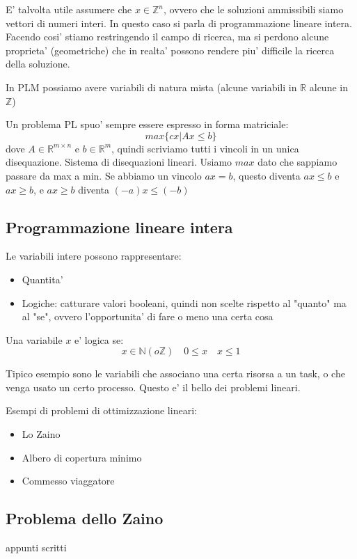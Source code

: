 E' talvolta utile assumere che $ x \in \mathbb{Z}^n $, ovvero che le soluzioni ammissibili siamo vettori di numeri interi. In questo caso si parla di programmazione lineare intera. Facendo cosi' stiamo restringendo il campo di ricerca, ma si perdono alcune proprieta' (geometriche) che in realta' possono rendere piu' difficile la ricerca della soluzione.

In PLM possiamo avere variabili di natura mista (alcune variabili in $ \mathbb{R} $ alcune in $ \mathbb{Z} $)

Un problema PL spuo' sempre essere espresso in forma matriciale:
\[
max \{cx | Ax \leq b\}
\]
dove $ A \in \mathbb{R}^{m \times n} $ e $ b \in \mathbb{R}^m $, quindi scriviamo tutti i vincoli in un unica disequazione. Sistema di disequazioni lineari. Usiamo $ max $ dato che sappiamo passare da max a min. Se abbiamo un vincolo $ ax = b $, questo diventa $ ax \leq b $ e $ ax \geq b $, e $ ax \geq b $ diventa $ (-a)x \leq (-b) $

\subsection{Programmazione lineare intera}

Le variabili intere possono rappresentare:
\begin{itemize}
\item Quantita'
\item Logiche: catturare valori booleani, quindi non scelte rispetto al "quanto" ma al "se", ovvero l'opportunita' di fare o meno una certa cosa
\end{itemize}

Una variabile $ x $ e' logica se:
\[
  x \in \mathbb{N} (o \mathbb{Z}) \quad 0\leq x \quad x \leq 1
\]

Tipico esempio sono le variabili che associano una certa risorsa a un task, o che venga usato un certo processo. Questo e' il bello dei problemi lineari. 

Esempi di problemi di ottimizzazione lineari:
\begin{itemize}
\item Lo Zaino
\item Albero di copertura minimo
\item Commesso viaggatore
\end{itemize}

\subsection{Problema dello Zaino}
appunti scritti


